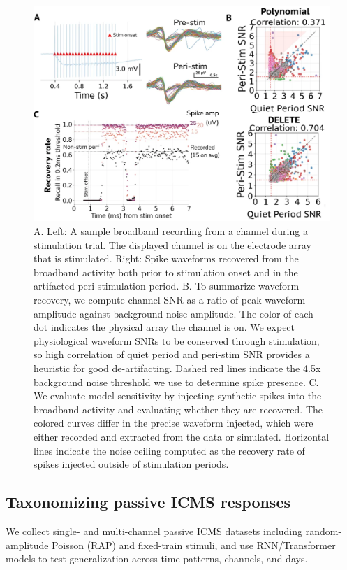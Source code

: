 \documentclass[12pt,oneside]{report}
\begin{document}
\begin{figure}[h]
  \centering
  \includegraphics[width=0.5\linewidth]{ch4_delete_peristim.png}
  \caption{A. Left: A sample broadband recording from a channel during a stimulation trial. The displayed channel is on the electrode array that is stimulated. Right: Spike waveforms recovered from the broadband activity both prior to stimulation onset and in the artifacted peri-stimulation period. B. To summarize waveform recovery, we compute channel SNR as a ratio of peak waveform amplitude against background noise amplitude. The color of each dot indicates the physical array the channel is on. We expect physiological waveform SNRs to be conserved through stimulation, so high correlation of quiet period and peri-stim SNR provides a heuristic for good de-artifacting. Dashed red lines indicate the 4.5x background noise threshold we use to determine spike presence. C. We evaluate model sensitivity by injecting synthetic spikes into the broadband activity and evaluating whether they are recovered. The colored curves differ in the precise waveform injected, which were either recorded and extracted from the data or simulated. Horizontal lines indicate the noise ceiling computed as the recovery rate of spikes injected outside of stimulation periods.}
  \label{fig:delete_peristim}
\end{figure}

\subsection*{Taxonomizing passive ICMS responses}
We collect single- and multi-channel passive ICMS datasets including random-amplitude Poisson (RAP) and fixed-train stimuli, and use RNN/Transformer models to test generalization across time patterns, channels, and days.
\end{document}
